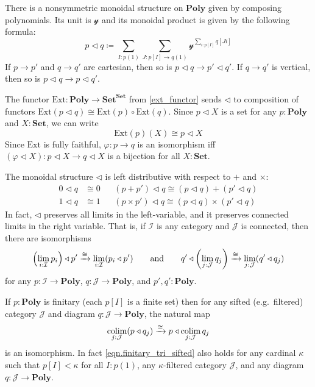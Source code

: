 \documentclass[11pt, one side, article]{memoir}
\theoremstyle{definition}
\theoremstyle{plain}
\DeclareMathOperator*{\colim}{colim}
\newcommand{\cat}[1]{\mathcal{#1}}%
\newcommand{\Cat}[1]{\mathbf{#1}}%
\newcommand{\fun}[1]{\mathrm{#1}}%
\newcommand{\To}[2][]{\xrightarrow[#1]{\tn{$#2$}}}
\newcommand{\tn}[1]{\textnormal{#1}}
\newcommand{\smset}{\Cat{Set}}
\newcommand{\yon}{{\mathcal{y}}}
\newcommand{\poly}{\Cat{Poly}}
\newcommand{\0}{\textsf{0}}
\newcommand{\1}{\tn{\textsf{1}}}
\newcommand{\tri}{\mathbin{\triangleleft}}
\newcommand{\hh}[2][]{#1 \tn{#2} #1}
\newcommand{\qqand}{\hh[\qquad]{and}}
\newcommand{\ext}{\fun{Ext}}
\begin{document}
There is a nonsymmetric monoidal structure on $\poly$ given by composing polynomials. Its unit is $\yon$ and its monoidal product is given by the following formula:
\begin{equation}
p\tri q\coloneqq\sum_{I: p(1)}\sum_{J\colon p[I]\to q(1)}\yon^{\sum\limits_{i: p[I]}q[Ji]}
\end{equation}
If $p\to p'$ and $q\to q'$ are cartesian, then so is $p\tri q\to p'\tri q'$. If $q\to q'$ is vertical, then so is $p\tri q\to p\tri q'$. 

The functor $\ext\colon\poly\to\smset^\smset$ from \eqref{ext_functor} sends $\tri$ to composition of functors $\ext(p\tri q)\cong\ext(p)\circ\ext(q)$. Since $p\tri X$ is a set for any $p:\poly$ and $X:\smset$, we can write
\begin{equation}
\ext(p)(X)\cong p\tri X
\end{equation}
Since $\ext$ is fully faithful, $\varphi\colon p\to q$ is an isomorphism iff $(\varphi\tri X)\colon p\tri X\to q\tri X$ is a bijection for all $X:\smset$.

The monoidal structure $\tri$ is left distributive with respect to $+$ and $\times$:
\begin{align}
	0\tri q&\cong 0&&(p+p')\tri q\cong (p\tri q)+(p'\tri q)\label{eqn.comp_plus}\\
	1\tri q&\cong 1&&(p\times p')\tri q\cong (p\tri q)\times(p'\tri q)\label{eqn.comp_times}
\end{align}
In fact, $\tri$ preserves all limits in the left-variable, and it preserves connected limits in the right variable. That is, if $\cat{I}$ is any category and $\cat{J}$ is connected, then there are isomorphisms
\begin{equation}
\left(\lim_{i:\cat{I}}p_i\right)\tri p'\To{\cong}\lim_{i:\cat{I}}(p_i\tri p')
\qqand
q'\tri\left(\lim_{j:\cat{J}}q_j\right)\To{\cong}\lim_{j:\cat{J}}(q'\tri q_j)
\end{equation}
for any $p\colon\cat{I}\to\poly$, $q\colon\cat{J}\to\poly$, and $p',q':\poly$.

If $p:\poly$ is finitary (each $p[I]$ is a finite set) then for any sifted (e.g.\ filtered) category $\cat{J}$ and diagram $q\colon \cat{J}\to\poly$, the natural map
\begin{equation}\label{eqn.finitary_tri_sifted}
  \colim_{j: \cat{J}}(p\tri q_j)
  \To{\cong}
	p\tri\colim_{j: \cat{J}}q_j
\end{equation}
is an isomorphism. In fact \cref{eqn.finitary_tri_sifted} also holds for any cardinal $\kappa$ such that $p[I]<\kappa$ for all $I:p(1)$, any $\kappa$-filtered category $\cat{J}$, and any diagram $q\colon \cat{J}\to\poly$.
\end{document}
